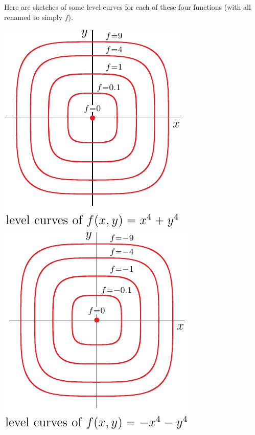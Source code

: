 Here are sketches of some level curves for each of these four functions
(with all renamed to simply $f$).

\begin{efig}
\begin{center}
   \includegraphics{f1Level.pdf}\qquad
   \includegraphics{f2Level.pdf}\qquad
\end{center}
\end{efig}


